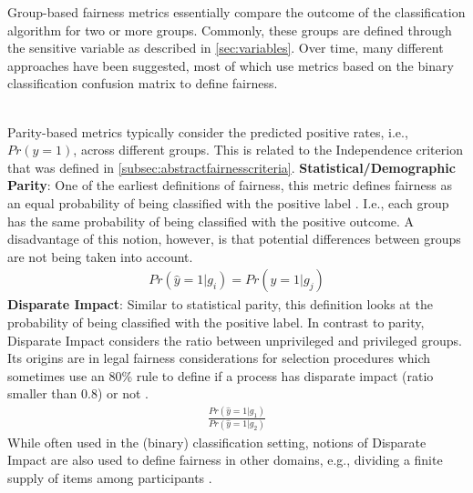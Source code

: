 Group-based fairness metrics essentially compare the outcome of the classification algorithm for two or more groups. Commonly, these groups are defined through the sensitive variable as described in \autoref{sec:variables}. Over time, many different approaches have been suggested, most of which use metrics based on the binary classification confusion matrix to define fairness.

\hfill\\
Parity-based metrics typically consider the predicted positive rates, i.e., $Pr(\hat{y}=1)$, across different groups. This is related to the Independence criterion that was defined in \autoref{subsec:abstractfairnesscriteria}.
\textbf{Statistical/Demographic Parity}: 
One of the earliest definitions of fairness, this metric defines fairness as an equal probability of being classified with the positive label . I.e., each group has the same probability of being classified with the positive outcome. A disadvantage of this notion, however, is that potential differences between groups are not being taken into account. 
\begin{align}
    Pr(\hat{y}=1 | g_i) = Pr(\hat{y}=1 | g_j)
\end{align}
\textbf{Disparate Impact}: Similar to statistical parity, this definition looks at the probability of being classified with the positive label. In contrast to parity, Disparate Impact considers the ratio between unprivileged and privileged groups. Its origins are in legal fairness considerations for selection procedures which sometimes use an 80\% rule to define if a process has disparate impact (ratio smaller than 0.8) or not . 
\begin{align}
   \frac{Pr(\hat{y}=1 | g_1)}{Pr(\hat{y}=1 | g_2)} 
\end{align}
While often used in the (binary) classification setting, notions of Disparate Impact are also used to define fairness in other domains, e.g., dividing a finite supply of items among participants .

